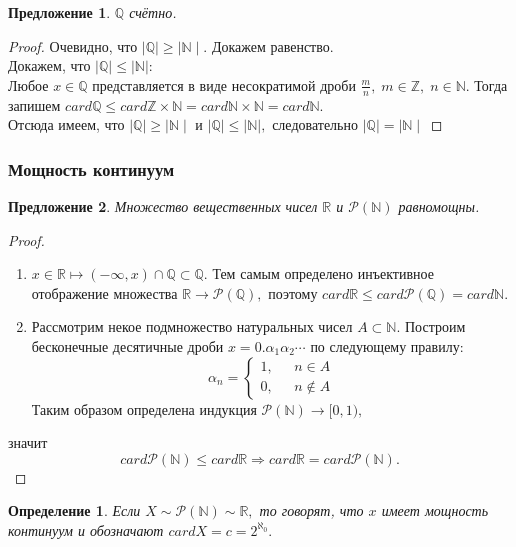 \documentclass{article}
\newtheorem{Proposition}{Предложение}[section]
\newtheorem{Definition}{Определение}[section]
\begin{document}
\begin{Proposition}
$\mathbb{Q}$ счётно.
\end{Proposition}
\begin{proof}
Очевидно, что $\mid\mathbb{Q}\mid \geq\mid\mathbb{N}\mid.$ Докажем равенство.\\
Докажем, что $\mid\mathbb{Q}\mid \leq\mid\mathbb{N}\mid:$ \\
Любое $x\in\mathbb{Q}$ представляется в виде несократимой дроби $\frac{m}{n}, \; m\in\mathbb{Z}, \; n\in\mathbb{N}.$ Тогда запишем $card\mathbb{Q}\leq card\mathbb{Z}\times\mathbb{N} = card\mathbb{N}\times\mathbb{N}=card\mathbb{N}.$\\
Отсюда имеем, что $\mid\mathbb{Q}\mid \geq\mid\mathbb{N}\mid$ и $\mid\mathbb{Q}\mid \leq\mid\mathbb{N}\mid,$ следовательно $\mid\mathbb{Q}\mid =\mid\mathbb{N}\mid$
\end{proof}

\subsubsection{Мощность континуум}
\begin{Proposition}
Множество вещественных чисел $\mathbb{R}$ и $\mathcal{P}(\mathbb{N})$ равномощны.
\end{Proposition}
\begin{proof}
\begin{enumerate}
\item $x\in\mathbb{R} \longmapsto (-\infty, x)\cap\mathbb{Q} \subset \mathbb{Q}.$ Тем самым определено инъективное отображение множества $\mathbb{R} \rightarrow\mathcal{P}(\mathbb{Q}),$ поэтому $card\mathbb{R}\leq card\mathcal{P}(\mathbb{Q})=card\mathbb{N}.$
\item Рассмотрим некое подмножество натуральных чисел $A\subset\mathbb{N}.$ Построим бесконечные десятичные дроби $x=0.\alpha_1\alpha_2\cdots$ по следующему правилу:
\begin{equation*}
\alpha_n = 
 \begin{cases}
   1, &\text{ $n\in A $}\\
   0, &\text{ $n\notin A$}
 \end{cases}
\end{equation*}
Таким образом определена индукция $\mathcal{P}(\mathbb{N}) \rightarrow [0, 1),$ 
\end{enumerate} 
значит $$card\mathcal{P}(\mathbb{N})\leq card\mathbb{R} \Rightarrow card\mathbb{R}= card\mathcal{P}(\mathbb{N}).$$
\end{proof}

\begin{Definition}
Если $X\sim\mathcal{P}(\mathbb{N})\sim\mathbb{R},$ то говорят, что $x$ имеет мощность континуум и обозначают $cardX=c=2^{\aleph_0}.$
\end{Definition}

\newpage
\end{document}
